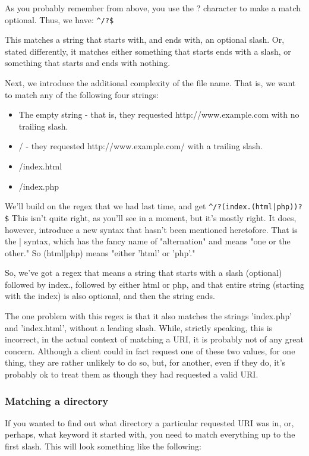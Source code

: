 As you probably remember from above, you use the ? character to make a match 
optional. Thus, we have: \verb=^/?$ =

This matches a string that starts with, and ends with, an optional slash. Or, stated 
differently, it matches either something that starts ends with a slash, or something that starts 
and ends with nothing.

Next, we introduce the additional complexity of the file name. That is, we want to match 
any of the following four strings:

\begin{itemize}
\item The empty string - that is, they requested http://www.example.com with no trailing slash.
\item / - they requested http://www.example.com/ with a trailing slash.
\item /index.html
\item /index.php
\end{itemize}

We'll build on the regex that we had last time, and get \verb=^/?(index.(html|php))?$=
This isn't quite right, as you'll see in a moment, but it's mostly right. It does, however, 
introduce a new syntax that hasn't been mentioned heretofore. That is the | syntax, which has 
the fancy name of "alternation" and means "one or the other." So (html|php) means "either 
'html' or 'php'."

So, we've got a regex that means a string that starts with a slash (optional) followed by 
index., followed by either html or php, and that entire string (starting with the index) is also 
optional, and then the string ends.

The one problem with this regex is that it also matches the strings 'index.php' and 
'index.html', without a leading slash. While, strictly speaking, this is incorrect, in the actual 
context of matching a URI, it is probably not of any great concern. Although a client could in 
fact request one of these two values, for one thing, they are rather unlikely to do so, but, for 
another, even if they do, it's probably ok to treat them as though they had requested a valid 
URI.

\subsubsection{Matching a directory}

If you wanted to find out what directory a particular requested URI was in, or, perhaps, 
what keyword it started with, you need to match everything up to the first slash. This will 
look something like the following: 

